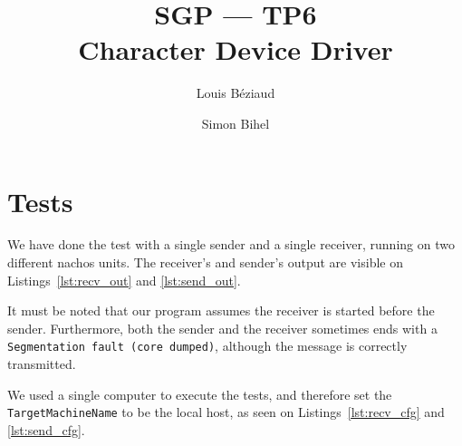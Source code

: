 \documentclass[a4paper,11pt,english]{article}
\title{SGP --- TP6\\Character Device Driver}
\author{Louis Béziaud \and Simon Bihel}
\begin{document}
\maketitle

\section{Tests}

We have done the test with a single sender and a single receiver, running on two different nachos units. The receiver's and sender's output are visible on Listings~\ref{lst:recv_out} and \ref{lst:send_out}.

It must be noted that our program assumes the receiver is started before the sender. Furthermore, both the sender and the receiver sometimes ends with a \texttt{Segmentation fault (core dumped)}, although the message is correctly transmitted.

We used a single computer to execute the tests, and therefore set the \texttt{TargetMachineName} to be the local host, as seen on Listings~\ref{lst:recv_cfg} and \ref{lst:send_cfg}. 

\begin{minipage}[t]{0.45\linewidth}

\end{minipage}
\hfill
\begin{minipage}[t]{0.45\linewidth}

\end{minipage}

\begin{minipage}[t]{0.45\linewidth}

\end{minipage}
\hfill
\begin{minipage}[t]{0.45\linewidth}

\end{minipage}
\end{document}
